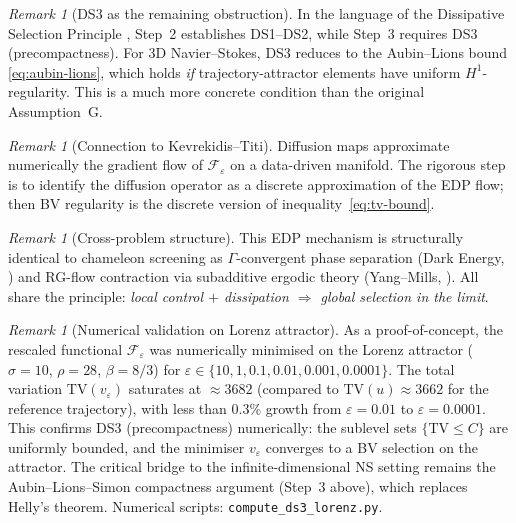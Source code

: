 \documentclass[12pt,a4paper]{article}
\theoremstyle{definition}
\theoremstyle{plain}
\theoremstyle{remark}
\newtheorem{remark}[definition]{Remark}
\begin{document}
\begin{remark}[DS3 as the remaining obstruction]\label{rem:ds3-ns}
In the language of the Dissipative Selection Principle \cite{FST-Unified2026}, Step~2 establishes DS1--DS2, while Step~3 requires DS3 (precompactness). For 3D Navier--Stokes, DS3 reduces to the Aubin--Lions bound \eqref{eq:aubin-lions}, which holds \emph{if} trajectory-attractor elements have uniform $H^1$-regularity. This is a much more concrete condition than the original Assumption~G.
\end{remark}

\begin{remark}[Connection to Kevrekidis--Titi]\label{rem:kevrekidis-edp}
Diffusion maps \cite{KevrekidisTiti2024} approximate numerically the gradient flow of $\mathcal{F}_\varepsilon$ on a data-driven manifold. The rigorous step is to identify the diffusion operator as a discrete approximation of the EDP flow; then BV regularity is the discrete version of inequality~\eqref{eq:tv-bound}.
\end{remark}

\begin{remark}[Cross-problem structure]\label{rem:cross-edp}
This EDP mechanism is structurally identical to chameleon screening as $\Gamma$-convergent phase separation (Dark Energy, \cite{Geiger2026-DE}) and RG-flow contraction via subadditive ergodic theory (Yang--Mills, \cite{Geiger2026-YM}). All share the principle: \emph{local control $+$ dissipation $\Rightarrow$ global selection in the limit}.
\end{remark}

\begin{remark}[Numerical validation on Lorenz attractor]\label{rem:ds3-lorenz}
As a proof-of-concept, the rescaled functional $\mathcal{F}_\varepsilon$ was numerically minimised on the Lorenz attractor ($\sigma = 10$, $\rho = 28$, $\beta = 8/3$) for $\varepsilon \in \{10, 1, 0.1, 0.01, 0.001, 0.0001\}$. The total variation $\mathrm{TV}(v_\varepsilon)$ saturates at $\approx 3682$ (compared to $\mathrm{TV}(u) \approx 3662$ for the reference trajectory), with less than $0.3\%$ growth from $\varepsilon = 0.01$ to $\varepsilon = 0.0001$. This confirms DS3 (precompactness) numerically: the sublevel sets $\{\mathrm{TV} \leq C\}$ are uniformly bounded, and the minimiser $v_\varepsilon$ converges to a BV selection on the attractor. The critical bridge to the infinite-dimensional NS setting remains the Aubin--Lions--Simon compactness argument (Step~3 above), which replaces Helly's theorem. Numerical scripts: \texttt{compute\_ds3\_lorenz.py}.
\end{remark}
\end{document}
